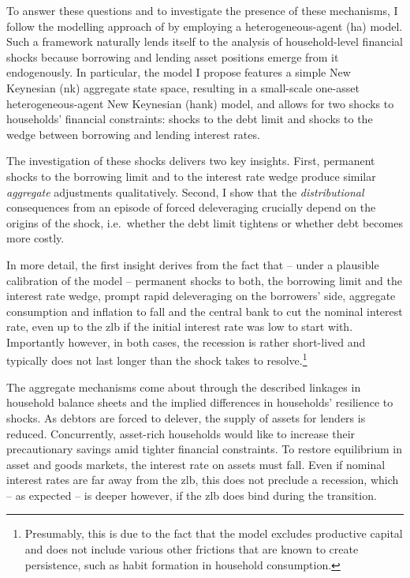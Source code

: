 \documentclass[12pt]{article} %
\numberwithin{equation}{section} %
\begin{document}
To answer these questions and to investigate the presence of these mechanisms, I follow the modelling approach of \textcite{gl2017} by employing a heterogeneous-agent (\Gls{ha}) model. Such a framework naturally lends itself to the analysis of household-level financial shocks because borrowing and lending asset positions emerge from it endogenously. In particular, the model I propose features a simple New Keynesian (\Gls{nk}) aggregate state space, resulting in a small-scale one-asset heterogeneous-agent New Keynesian (\Gls{hank}) model, and allows for two shocks to households' financial constraints: shocks to the debt limit and shocks to the wedge between borrowing and lending interest rates.

The investigation of these shocks delivers two key insights. First, permanent shocks to the borrowing limit and to the interest rate wedge produce similar \textit{aggregate} adjustments qualitatively. Second, I show that the \textit{distributional} consequences from an episode of forced deleveraging crucially depend on the origins of the shock, i.e.~whether the debt limit tightens or whether debt becomes more costly.

In more detail, the first insight derives from the fact that -- under a plausible calibration of the model -- permanent shocks to both, the borrowing limit and the interest rate wedge, prompt rapid deleveraging on the borrowers' side, aggregate consumption and inflation to fall and the central bank to cut the nominal interest rate, even up to the \Gls{zlb} if the initial interest rate was low to start with. Importantly however, in both cases, the recession is rather short-lived and typically does not last longer than the shock takes to resolve.\footnote{Presumably, this is due to the fact that the model excludes productive capital and does not include various other frictions that are known to create persistence, such as habit formation in household consumption.} 

The aggregate mechanisms come about through the described linkages in household balance sheets and the implied differences in households' resilience to shocks. As debtors are forced to delever, the supply of assets for lenders is reduced. Concurrently, asset-rich households would like to increase their precautionary savings amid tighter financial constraints. To restore equilibrium in asset and goods markets, the interest rate on assets must fall. Even if nominal interest rates are far away from the \Gls{zlb}, this does not preclude a recession, which -- as expected -- is deeper however, if the \Gls{zlb} does bind during the transition. 
\end{document}
